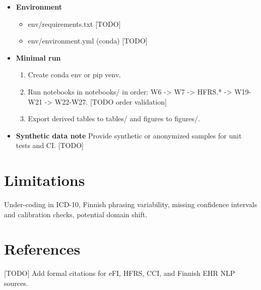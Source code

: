 \documentclass[
  english,
  letterpaper,
  DIV=11,
  numbers=noendperiod]{scrartcl}
\providecommand{\tightlist}{%
  \setlength{\itemsep}{0pt}\setlength{\parskip}{0pt}}
\begin{document}
\begin{itemize}
\tightlist
\item
  \textbf{Environment}

  \begin{itemize}
  \tightlist
  \item
    env/requirements.txt {[}TODO{]}
  \item
    env/environment.yml (conda) {[}TODO{]}
  \end{itemize}
\item
  \textbf{Minimal run}

  \begin{enumerate}
  \def\labelenumi{\arabic{enumi}.}
  \tightlist
  \item
    Create conda env or pip venv.
  \item
    Run notebooks in notebooks/ in order: W6 -\textgreater{} W7
    -\textgreater{} HFRS.* -\textgreater{} W19-W21 -\textgreater{}
    W22-W27. {[}TODO order validation{]}
  \item
    Export derived tables to tables/ and figures to figures/.
  \end{enumerate}
\item
  \textbf{Synthetic data note} Provide synthetic or anonymized samples
  for unit tests and CI. {[}TODO{]}
\end{itemize}

\section{Limitations}\label{limitations}

Under-coding in ICD-10, Finnish phrasing variability, missing confidence
intervals and calibration checks, potential domain shift.

\section{References}\label{references}

{[}TODO{]} Add formal citations for eFI, HFRS, CCI, and Finnish EHR NLP
sources.
\end{document}
